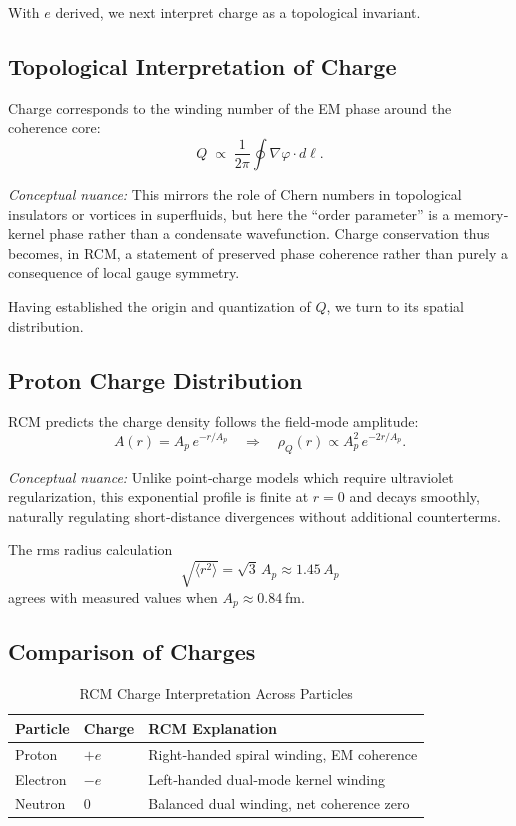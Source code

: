 \bigskip
With \(e\) derived, we next interpret charge as a topological invariant.

\subsection{Topological Interpretation of Charge}
Charge corresponds to the winding number of the EM phase around the coherence core:
\begin{equation}\label{eq:winding}
Q \;\propto\;\frac{1}{2\pi}\oint \nabla\varphi\cdot d\boldsymbol{\ell}.
\end{equation}

\vspace{1ex}
\noindent\emph{Conceptual nuance:}  This mirrors the role of Chern numbers in topological insulators or vortices in superfluids, but here the “order parameter” is a memory‐kernel phase rather than a condensate wavefunction.  Charge conservation thus becomes, in RCM, a statement of preserved phase coherence rather than purely a consequence of local gauge symmetry.

\bigskip
Having established the origin and quantization of \(Q\), we turn to its spatial distribution.

\subsection{Proton Charge Distribution}
RCM predicts the charge density follows the field‐mode amplitude:
\begin{equation}\label{eq:rho_profile}
A(r)=A_p\,e^{-r/A_p}
\quad\Longrightarrow\quad
\rho_Q(r)\propto A_p^2\,e^{-2r/A_p}.
\end{equation}

\vspace{1ex}
\noindent\emph{Conceptual nuance:}  Unlike point‐charge models which require ultraviolet regularization, this exponential profile is finite at \(r=0\) and decays smoothly, naturally regulating short‐distance divergences without additional counterterms.

The rms radius calculation
\[
\sqrt{\langle r^2\rangle}
= \sqrt{3}\,A_p \approx 1.45\,A_p
\]
agrees with measured values when \(A_p\approx0.84\) fm.

\subsection{Comparison of Charges}
\begin{table}[ht]
  \centering
  \caption{RCM Charge Interpretation Across Particles}
  \begin{tabular}{@{}lll@{}}
    \toprule
    Particle & Charge & RCM Explanation \\
    \midrule
    Proton   & \(+e\)  & Right‐handed spiral winding, EM coherence \\
    Electron & \(-e\)  & Left‐handed dual‐mode kernel winding \\
    Neutron  & 0       & Balanced dual winding, net coherence zero \\
    \bottomrule
  \end{tabular}
\end{table}

